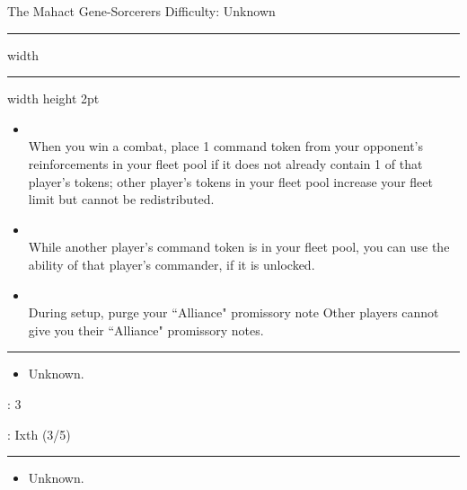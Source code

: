 {\handel\Huge The Mahact Gene-Sorcerers} \hfill {\Large Difficulty: Unknown} \vspace{-4pt}\\
\hrule width \hsize \kern 1mm \hrule width \hsize height 2pt


\begin{multicols}{2}


\begin{itemize}
\item {}\\
When you win a combat, place 1 command token from your opponent's reinforcements in your fleet pool if it does not already contain 1 of that player's tokens; other player's tokens in your fleet pool increase your fleet limit but cannot be redistributed.
\item {}\\
While another player's command token is in your fleet pool, you can use the ability of that player's commander, if it is unlocked.
\item {}\\
During setup, purge your ``Alliance" promissory note Other players cannot give you their ``Alliance" promissory notes.
\end{itemize}


\vspace{-10pt}\rule{\hsize}{0.4pt}\vspace{5pt}


\vspace{-5pt}
\begin{multicols}{2}
\begin{itemize}
\item Unknown.
\end{itemize}
\end{multicols}

\vspace{-5pt}
: 3

\vspace{2pt}
: Ixth (3/5)

\rule{\hsize}{0.4pt}\vspace{5pt}


\begin{itemize}
\item Unknown.
\end{itemize}


\end{multicols}
